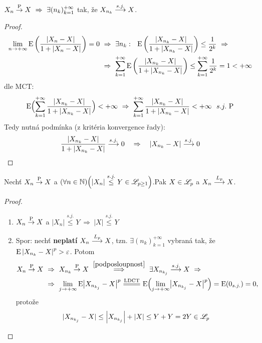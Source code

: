 \begin{theorem}\label{podposloupnost}
	$X_n\stackrel{\mathrm{P}}{\to} X~\Rightarrow~ \exists (n_k)_{k=1}^{+\infty}$ tak, že $X_{n_k}\stackrel{s.j.}{\longrightarrow} X$.
	\begin{proof}
		\[
		\begin{split}
		\lim\limits_{ n\to +\infty}\mathrm{E} \left( \frac{|X_n-X|}{1+|X_n-X|} \right)=0~&\Rightarrow~\exists n_k:~~\mathrm{E} \left( \frac{|X_{n_k}-X|}{1+|X_{n_k}-X|} \right)\leq \frac{1}{2^k}~\Rightarrow \\
		&\Rightarrow~\sum\limits_{k=1}^{+\infty}\mathrm{E} \left( \frac{|X_{n_k}-X|}{1+|X_{n_k}-X|} \right)\leq \sum\limits_{k=1}^{+\infty}\frac{1}{2^k}=1<+\infty
		\end{split}
		\] 
		dle MCT:
		$$ \mathrm{E} \Bigl( \sum\limits_{k=1}^{+\infty}\frac{|X_{n_k}-X|}{1+|X_{n_k}-X|} \Bigr)<+\infty~\Rightarrow~ \sum\limits_{k=1}^{+\infty}\frac{|X_{n_k}-X|}{1+|X_{n_k}-X|}<+\infty~~s.j.~\mathrm{P} $$
		Tedy nutná podmínka (z kritéria konvergence řady): $$ \frac{|X_{n_k}-X|}{1+|X_{n_k}-X|}\stackrel{s.j.}{\longrightarrow} 0~~~\Rightarrow~~~|X_{n_k}-X|\stackrel{s.j.}{\longrightarrow}0 $$
	\end{proof}
\end{theorem}
\begin{theorem}
	Nechť $X_n\stackrel{\mathrm{P}}{\to} X$ a $(\forall n\in\mathbb{N})\Bigl(|X_n|\stackrel{s.j.}{\leq}Y\in\mathscr{L}_{p\geq 1}\Bigr)$.\newline Pak $X\in\mathscr{L}_p$ a $X_n\stackrel{L_p}{\longrightarrow} X$. 
	\begin{proof}
		~\begin{enumerate}[	a)]
			\item $X_n\stackrel{\mathrm{P}}{\to} X$ a $|X_n|\stackrel{s.j.}{\leq}Y~\Rightarrow~ |X|\stackrel{s.j.}{\leq}Y$
			\item Spor: nechť \textbf{neplatí} $X_n\stackrel{L_p}{\longrightarrow} X$, tzn. $\exists (n_k)_{k=1}^{+\infty}$ vybraná tak, že  $\mathrm{E} \left| X_{n_k}-X \right|^p>\varepsilon$. Potom
			\[
			\begin{split}
			X_n\Pto X~&\Rightarrow~ X_{n_k}\Pto X~\stackrel{\ref{podposloupnost}}{\Longrightarrow}~ \exists X_{n_{k_j}}\sj X~\Rightarrow~\\ &\Rightarrow~ \lim\limits_{ j\to +\infty} \E \bigl|X_{n_{k_j}}-X\bigr|^p\equal{\text{LDCT}} \E  \Br{\lim\limits_{ j\to +\infty}\bigl| X_{n_{k_j}}-X \bigr|^p }=\E (0_{s.j.})=0,
			\end{split}
			\] protože 
			$$ |X_{n_{k_j}}-X|\leq \left| X_{n_{k_j}} \right|+|X|\leq Y+Y=2Y\in\mathscr{L}_p $$
		
		\end{enumerate}
	\end{proof}
\end{theorem}

